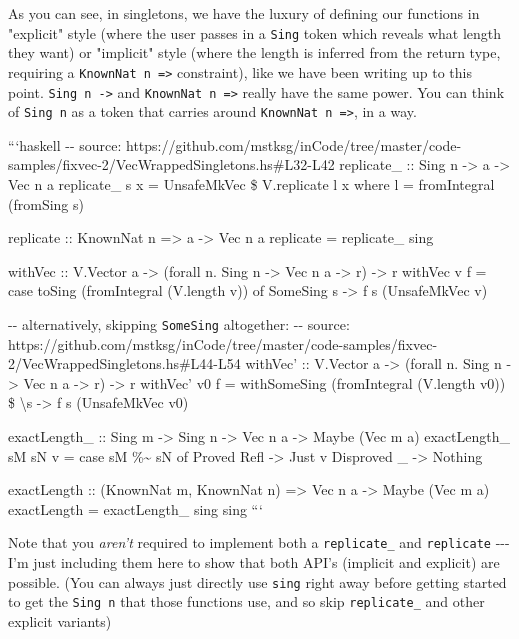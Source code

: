 \documentclass[]{article}
\begin{document}
As you can see, in singletons, we have the luxury of defining our functions in
"explicit" style (where the user passes in a \texttt{Sing} token which reveals
what length they want) or "implicit" style (where the length is inferred from
the return type, requiring a \texttt{KnownNat\ n\ =\textgreater{}} constraint),
like we have been writing up to this point. \texttt{Sing\ n\ -\textgreater{}}
and \texttt{KnownNat\ n\ =\textgreater{}} really have the same power. You can
think of \texttt{Sing\ n} as a token that carries around
\texttt{KnownNat\ n\ =\textgreater{}}, in a way.

```haskell -\/- source:
https://github.com/mstksg/inCode/tree/master/code-samples/fixvec-2/VecWrappedSingletons.hs\#L32-L42
replicate\_ :: Sing n -\textgreater{} a -\textgreater{} Vec n a replicate\_ s x
= UnsafeMkVec \$ V.replicate l x where l = fromIntegral (fromSing s)

replicate :: KnownNat n =\textgreater{} a -\textgreater{} Vec n a replicate =
replicate\_ sing

withVec :: V.Vector a -\textgreater{} (forall n. Sing n -\textgreater{} Vec n a
-\textgreater{} r) -\textgreater{} r withVec v f = case toSing (fromIntegral
(V.length v)) of SomeSing s -\textgreater{} f s (UnsafeMkVec v)

-\/- alternatively, skipping \texttt{SomeSing} altogether: -\/- source:
https://github.com/mstksg/inCode/tree/master/code-samples/fixvec-2/VecWrappedSingletons.hs\#L44-L54
withVec' :: V.Vector a -\textgreater{} (forall n. Sing n -\textgreater{} Vec n a
-\textgreater{} r) -\textgreater{} r withVec' v0 f = withSomeSing (fromIntegral
(V.length v0)) \$ \textbackslash{}s -\textgreater{} f s (UnsafeMkVec v0)

exactLength\_ :: Sing m -\textgreater{} Sing n -\textgreater{} Vec n a
-\textgreater{} Maybe (Vec m a) exactLength\_ sM sN v = case sM
\%\textasciitilde{} sN of Proved Refl -\textgreater{} Just v Disproved \_
-\textgreater{} Nothing

exactLength :: (KnownNat m, KnownNat n) =\textgreater{} Vec n a -\textgreater{}
Maybe (Vec m a) exactLength = exactLength\_ sing sing ```

Note that you \emph{aren't} required to implement both a \texttt{replicate\_}
and \texttt{replicate} -\/-\/- I'm just including them here to show that both
API's (implicit and explicit) are possible. (You can always just directly use
\texttt{sing} right away before getting started to get the \texttt{Sing\ n} that
those functions use, and so skip \texttt{replicate\_} and other explicit
variants)
\end{document}
